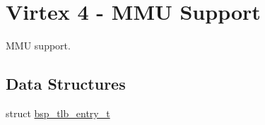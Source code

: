 \hypertarget{group__Virtex4MMU}{}\section{Virtex 4 -\/ M\+MU Support}
\label{group__Virtex4MMU}


M\+MU support.  


\subsection*{Data Structures}
\begin{DoxyCompactItemize}
\item 
struct \mbox{\hyperlink{structbsp__tlb__entry__t}{bsp\+\_\+tlb\+\_\+entry\+\_\+t}}
\end{DoxyCompactItemize}
